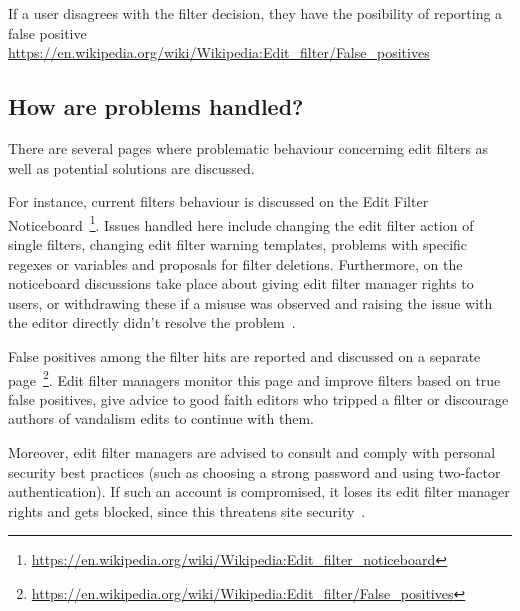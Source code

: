 If a user disagrees with the filter decision, they have the posibility of reporting a false positive
\url{https://en.wikipedia.org/wiki/Wikipedia:Edit_filter/False_positives}

\subsection{How are problems handled?}

There are several pages where problematic behaviour concerning edit filters as well as potential solutions are discussed.

For instance, current filters behaviour is discussed on the Edit Filter Noticeboard~\footnote{\url{https://en.wikipedia.org/wiki/Wikipedia:Edit_filter_noticeboard}}.
Issues handled here include changing the edit filter action of single filters, changing edit filter warning templates, problems with specific regexes or variables and proposals for filter deletions.
Furthermore, on the noticeboard discussions take place about giving edit filter manager rights to users, or withdrawing these if a misuse was observed and raising the issue with the editor directly didn't resolve the problem~\cite{Wikipedia:EditFilter}.

False positives among the filter hits are reported and discussed on a separate page~\footnote{\url{https://en.wikipedia.org/wiki/Wikipedia:Edit_filter/False_positives}}.
Edit filter managers monitor this page and improve filters based on true false positives, give advice to good faith editors who tripped a filter or discourage authors of vandalism edits to continue with them.

Moreover, edit filter managers are advised to consult and comply with personal security best practices (such as choosing a strong password and using two-factor authentication).
If such an account is compromised, it loses its edit filter manager rights and gets blocked, since this threatens site security~\cite{Wikipedia:EditFilter}.


